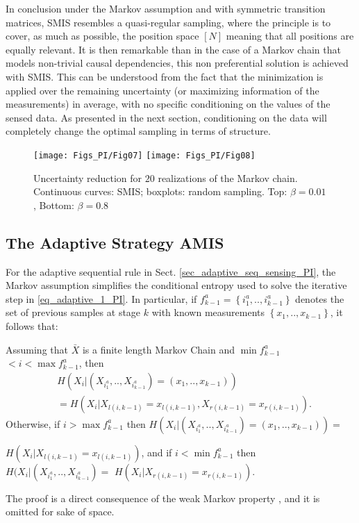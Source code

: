 In conclusion under the Markov assumption and with symmetric transition matrices, SMIS resembles a quasi-regular sampling, where the principle is to cover, as much as possible, the position space $[N]$ meaning that all positions are equally relevant. It is then remarkable than in the case of a Markov chain that models non-trivial causal dependencies, this non preferential solution is achieved with SMIS.  This can be understood from the fact that the minimization is applied over the remaining uncertainty (or maximizing information of the measurements) in average,  with no specific conditioning on the values of the sensed data. As presented in the next section, conditioning on the data will completely change the optimal sampling in terms of structure. 
\begin{figure}[!ht]
    \centering
    \texttt{[image: Figs\_PI/Fig07]}
    \texttt{[image: Figs\_PI/Fig08]}		
	\caption[Uncertainty reduction for $20$ realizations of the Markov chain.]{\label{fig:re_iterMarkov_vs_Rand_2_PI} Uncertainty reduction for $20$ realizations of the Markov chain. Continuous curves: SMIS; boxplots: random sampling. Top: $\beta = 0.01$, Bottom: $\beta = 0.8$}
\end{figure}

\subsection{The Adaptive Strategy AMIS}
\label{sec_markov_adapt_PI}
For the adaptive sequential rule in Sect. \ref{sec_adaptive_seq_sensing_PI}, the Markov assumption simplifies the conditional entropy used to solve the iterative step in  \eqref{eq_adaptive_1_PI}. In particular, if ${f}^a_{k-1}=\left\{i^a_1,..,i^a_{k-1} \right\}$ denotes the set of previous samples at stage $k$ with known measurements $\left\{x_1,..,x_{k-1} \right\}$, it follows that:

\begin{proposition}\label{pro_iter_markov_rule_adapt_PI}
	Assuming that $\bar{X}$ is a finite length Markov Chain and $\min {f}^a_{k-1} $ $ <i < \max {f}^a_{k-1}$, then
	\begin{align} \label{eq_sec_markov_adapt_1_PI}
		&H(X_{i}|(X_{i^a_1},..,X_{i^a_{k-1}})=(x_1,..,x_{k-1})) \nonumber\\
		&= H(X_{i}| X_{l(i,{k-1})}=x_{l(i,{k-1})}, X_{r(i,{k-1})}= x_{r(i,{k-1})}).
	\end{align}
	Otherwise, if $ i > \max {f}^a_{k-1}$ then $H(X_{i}|(X_{i^a_1},..,X_{i^a_{k-1}}) =(x_1,..,x_{k-1})) =$
	 
\noindent $H(X_{i}| X_{l(i,{k-1})}= x_{l(i,{k-1})})$, 
	and if $i < \min {f}^a_{k-1}$ then $H(X_{i}|(X_{i^a_1},..,X_{i^a_{k-1}}) =$ $H(X_{i}|X_{r(i,{k-1})}=x_{r(i,{k-1})})$.
\end{proposition}
{The proof is a direct consequence of the weak Markov property \citep{norris_1997}, and it is omitted for sake of space.}

